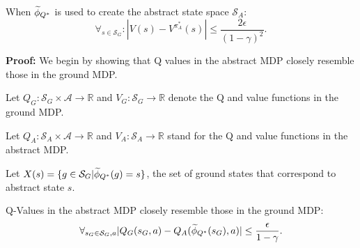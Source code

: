 \begin{lma}
\label{lma:Q*}
When $\widetilde \phi_{Q^*}$ is used to create the abstract state space $\mathcal{S}_A$:
\begin{equation}
\forall_{s \in \mathcal{S}_G}: | V(s) - V^{\pi^*_{A}}(s) | \leq \frac{2\epsilon}{(1-\gamma)^2}.
\end{equation}
\end{lma}

\textbf{Proof:}
We begin by showing that Q values in the abstract \ac{MDP} closely resemble those in the ground \ac{MDP}.

Let $Q_G: \mathcal{S}_G \times \mathcal{A} \rightarrow \mathbb{R}$ and $V_G: \mathcal{S}_G \rightarrow \mathbb{R}$ denote the Q and value functions in the ground \ac{MDP}.

Let $Q_A: \mathcal{S}_A \times \mathcal{A} \rightarrow \mathbb{R}$ and $V_A: \mathcal{S}_A \rightarrow \mathbb{R}$  stand for the Q and value functions in the abstract \ac{MDP}.


Let $X(s) = \{g \in \mathcal{S}_G | \widetilde \phi_{Q^*}(g) = s\}$, the set of ground states that correspond to abstract state $s$.

\begin{clm}
Q-Values in the abstract \ac{MDP} closely resemble those in the ground \ac{MDP}:
\begin{equation}
\label{eq:Q*Claim1}
\forall_{s_G \in \mathcal{S}_G, a} |Q_G(s_G, a) - Q_A(\widetilde \phi_{Q^*}(s_G), a)| \leq \frac{\epsilon}{1-\gamma}.
\end{equation}
\end{clm}

